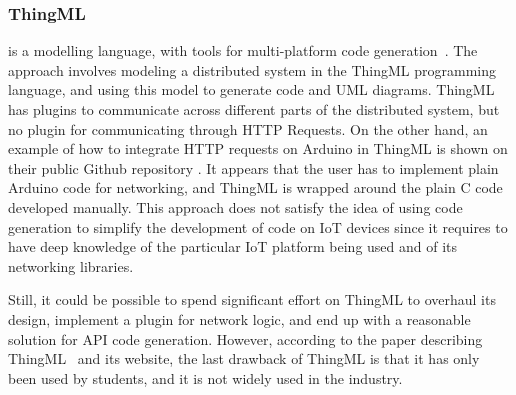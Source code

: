 \documentclass[manuscript,screen]{acmart}
\begin{document}
\subsubsection{ThingML}
\cite{ThingMLpaper} is a modelling language, with tools for multi-platform code generation~\cite{WhatIsThingML}. The approach involves modeling a distributed system in the ThingML programming language, and using this model to generate code and UML diagrams. ThingML has plugins to communicate across different parts of the distributed system, but no plugin for communicating through HTTP Requests. On the other hand, an example of how to integrate HTTP requests on Arduino in ThingML is shown on their public Github repository \cite{ThingMLServerExample}. It appears that the user has to implement plain Arduino code for networking, and ThingML is wrapped around the plain C code developed manually. This approach does not satisfy the idea of using code generation to simplify the development of code on IoT devices since it requires to have deep knowledge of the particular IoT platform being used and of its networking libraries. 


Still, it could be possible to spend significant effort on ThingML to overhaul its design, implement a plugin for network logic, and end up with a reasonable solution for API code generation. However, according to the paper describing ThingML~\cite{WhatIsThingML} and its website, the last drawback of ThingML is that it has only been used by students, and it is not widely used in the industry. 

\end{document}
